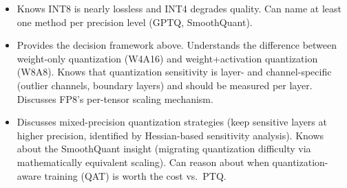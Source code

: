 \begin{interviewq}
\goodgreat
\begin{itemize}
    \item {} Knows INT8 is nearly lossless and INT4 degrades quality. Can name at least one method per precision level (GPTQ, SmoothQuant).
    \item {} Provides the decision framework above. Understands the difference between weight-only quantization (W4A16) and weight+activation quantization (W8A8). Knows that quantization sensitivity is layer- and channel-specific (outlier channels, boundary layers) and should be measured per layer. Discusses FP8's per-tensor scaling mechanism.
    \item {} Discusses mixed-precision quantization strategies (keep sensitive layers at higher precision, identified by Hessian-based sensitivity analysis). Knows about the SmoothQuant insight (migrating quantization difficulty via mathematically equivalent scaling). Can reason about when quantization-aware training (QAT) is worth the cost vs.\ PTQ.
\end{itemize}

\end{interviewq}

